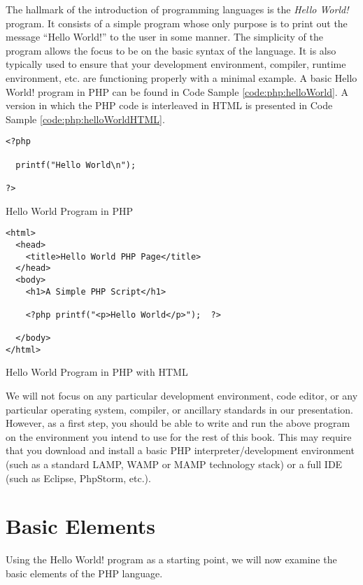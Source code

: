 The hallmark of the introduction of programming languages is the \emph{Hello World!}
program.  It consists of a simple program whose only purpose is to print out the message
``Hello World!'' to the user in some manner.  The simplicity of the program allows the
focus to be on the basic syntax of the language.  It is also typically used to ensure that 
your development environment, compiler, runtime environment, etc. are functioning 
properly with a minimal example.  A basic Hello World! program in PHP can be found 
in Code Sample \ref{code:php:helloWorld}.  A version in which the PHP code is
interleaved in HTML is presented in Code Sample \ref{code:php:helloWorldHTML}.

\begin{listing}
\begin{verbatim}
<?php

  printf("Hello World\n");

?>
\end{verbatim}
\caption{Hello World Program in PHP}
\label{code:php:helloWorld}
\end{listing}

\begin{listing}
\begin{verbatim}
<html>
  <head>
    <title>Hello World PHP Page</title>
  </head>
  <body>
    <h1>A Simple PHP Script</h1>

    <?php printf("<p>Hello World</p>");  ?>
    
  </body>
</html>
\end{verbatim}
\caption{Hello World Program in PHP with HTML}
\label{code:php:helloWorldHTML}
\end{listing}

We will not focus on any particular development environment, code editor, or any 
particular operating system, compiler, or ancillary standards in our presentation.  However,
as a first step, you should be able to write and run the above program on the
environment you intend to use for the rest of this book.  This may require that you download
and install a basic PHP interpreter/development environment (such as a standard 
LAMP, WAMP or MAMP technology stack) or a full IDE (such as Eclipse, PhpStorm, etc.).

\section{Basic Elements}

Using the Hello World! program as a starting point, we will now examine the basic
elements of the PHP language.

